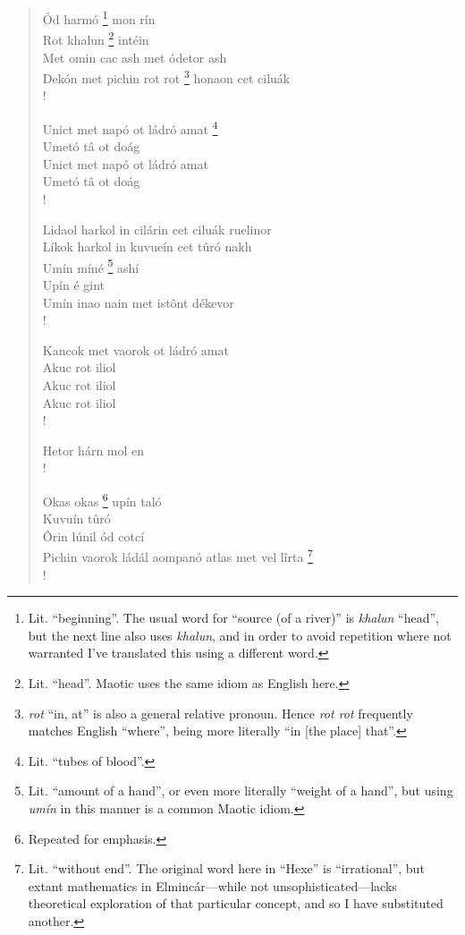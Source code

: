 \documentclass{article}
\let\oldthefootnote\thefootnote
\newcommand\oocfootnote[2][DarkGreen]{\renewcommand\thefootnote{\color{#1}\oldthefootnote}%
  \footnote{\color{#1}#2}%
  \renewcommand{\thefootnote}{\oldthefootnote}}
\begin{document}
\begin{verse}
Ód harmó\oocfootnote{Lit. ``beginning''. The usual word for ``source (of a river)'' is \emph{khalun} ``head'', but the next line also uses \emph{khalun}, and in order to avoid repetition where not warranted I've translated this using a different word.} mon rín \\
Rot khalun\oocfootnote{Lit. ``head''. Maotic uses the same idiom as English here.} intéin \\
Met omin cac ash met ódetor ash \\

Dekón met pichin rot rot\oocfootnote{\emph{rot} ``in, at'' is also a general relative pronoun. Hence \emph{rot rot} frequently matches English ``where'', being more literally ``in [the place] that''.} honaon cet ciluák \\!

Unict met napó ot ládró amat\oocfootnote{Lit. ``tubes of blood''.} \\
Umetó tâ ot doág \\
Unict met napó ot ládró amat \\
Umetó tâ ot doág \\!

Lidaol harkol in cilárin cet ciluák ruelinor \\
Líkok harkol in kuvueín cet tûró nakh \\
Umín míné\oocfootnote{Lit. ``amount of a hand'', or even more literally ``weight of a hand'', but using \emph{umín} in this manner is a common Maotic idiom.} ashí \\
Upín é gint \\
Umín inao nain met istônt dékevor \\!

Kancok met vaorok ot ládró amat \\
Akuc rot iliol \\
Akuc rot iliol \\
Akuc rot iliol \\!

Hetor hárn mol en \\!

Okas okas\oocfootnote{Repeated for emphasis.} upín taló \\
Kuvuín tûró \\
Ôrin lúnil ód cotcí \\
Pichin vaorok ládál aompanó atlas met vel lîrta\oocfootnote{Lit. ``without end''. The original word here in ``Hexe'' is ``irrational'', but extant mathematics in Elmincár—while not unsophisticated—lacks theoretical exploration of that particular concept, and so I have substituted another.} \\!


\end{verse}
\end{document}
